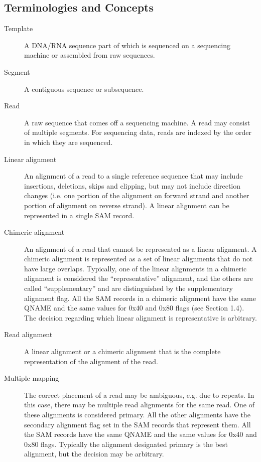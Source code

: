 \documentclass[10pt]{article}
\begin{document}
\pagebreak

\subsection{Terminologies and Concepts}

\begin{description}
\item[Template] A DNA/RNA sequence part of which is sequenced on a
  sequencing machine or assembled from raw sequences.

\item[Segment] A contiguous sequence or subsequence.

\item[Read] A raw sequence that comes off a sequencing machine. A read
  may consist of multiple segments. For sequencing data, reads are indexed by
  the order in which they are sequenced.

\item[Linear alignment]
  An alignment of a read to a single reference sequence that may include
  insertions, deletions, skips and clipping, but may not include direction
  changes (i.e. one portion of the alignment on forward strand and another
  portion of alignment on reverse strand). A linear alignment can be
  represented in a single SAM record.

\item[Chimeric alignment]
  An alignment of a read that cannot be represented as a linear alignment. A
  chimeric alignment is represented as a set of linear alignments that do not
  have large overlaps.  Typically, one of the linear alignments in a chimeric
  alignment is considered the ``representative'' alignment, and the others are
  called ``supplementary'' and are distinguished by the supplementary alignment
  flag.  All the SAM records in a chimeric alignment have the same {\sf QNAME}
  and the same values for 0x40 and 0x80 flags (see Section 1.4). The decision
  regarding which linear alignment is representative is arbitrary.

\item[Read alignment]
  A linear alignment or a chimeric alignment that is the complete
  representation of the alignment of the read.

\item[Multiple mapping]
  The correct placement of a read may be ambiguous, e.g. due to repeats.  In
  this case, there may be multiple read alignments for the same read.  One of
  these alignments is considered primary.  All the other alignments have the
  secondary alignment flag set in the SAM records that represent them.  All the
  SAM records have the same {\sf QNAME} and the same values for 0x40 and 0x80
  flags.  Typically the alignment designated primary is the best alignment, but
  the decision may be arbitrary.\footnotemark


\end{description}
\end{document}
